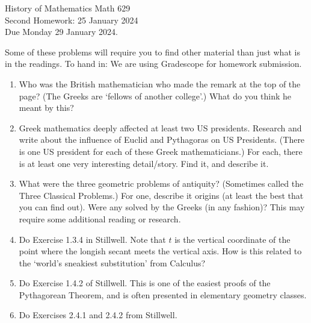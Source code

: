 \documentclass[12pt]{article}
\begin{document}
\LARGE 
\noindent
{\color{Maroon}History of Mathematics \hfill Math 629}\vspace{2pt}\\
\large
Second Homework: \hfill 25 January 2024\\
Due Monday 29 January 2024.
\normalsize\vspace{10pt}

      Some of these problems will require you to find other material than just what is in the readings.
To hand in: We are using Gradescope for homework submission.


\begin{enumerate}

\item    Who was the British mathematician who made the remark at the top of the page?
  (The Greeks are `fellows of another college'.)
  What do you think he meant by this?


\item     Greek mathematics deeply affected at least two US presidents. Research and write about the influence of Euclid and Pythagoras on
  US Presidents. (There is one US president for each of these Greek mathematicians.)
  For each, there is at least one very interesting
  detail/story. Find it, and describe it. 


\item     What were the three geometric problems of antiquity? (Sometimes called the Three Classical Problems.)
  For one, describe it origins (at least the best that you can find out). Were any solved by the Greeks (in any fashion)?
  This may require some additional reading or research.


\item     Do Exercise 1.3.4 in Stillwell. Note that $t$ is the vertical coordinate of the point where the longish secant meets the vertical
  axis. How is this related to the `world's sneakiest substitution' from Calculus? 


\item     Do Exercise 1.4.2 of Stillwell.
  This is one of the easiest proofs of the Pythagorean Theorem, and is often presented in elementary geometry classes.


\item     Do Exercises 2.4.1 and 2.4.2 from Stillwell.


%
%
       
\end{enumerate}
\end{document}
